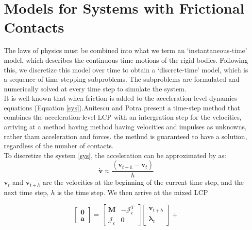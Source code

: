 \section{Models for Systems with Frictional Contacts}

        The laws of physics must be combined into what we term an `instantaneous-time' model, which describes the continuous-time motions of the rigid bodies. Following this, we discretize this model over time to obtain a ‘discrete-time’ model, which is a sequence of time-stepping subproblems. The subproblems are formulated and numerically solved at every time step to simulate the system. \\

        It is well known that when friction is added to the acceleration-level dynamics equations (Equation \ref{sys}).Anitescu and Potra \cite{anitescu1997modeling} present a time-step method that combines the acceleration-level LCP with an intergration step for the velocities, arriving at a method having method having velocities and impulses as unknowns, rather tham acceleration and forces. the methud is guaranteed to have a solution, regardless of the number of contacts. \\

        To discretize the system \ref{sys}, the acceleration can be approximated by \cite{anitescu1997modeling} as:
            \begin{equation}
                \dot{\mathbf{v}} \approx \frac{(\mathbf{v}_{t+h} - \mathbf{v}_t)}{h}
            \end{equation}
        $\mathbf{v}_t$ and $\mathbf{v}_{t+h}$ are the velocities at the beginning of the current time step, and the next time step, $h$ is the time step. We then arrive at the mixed LCP

        \begin{equation}
            \left[\begin{array}{c}\pmb{0} \\ \pmb{a} \end{array}\right] = \left[\begin{array}{cc} \pmb{M} & -\mathcal{J}_{c}^{T} \\ \mathcal{J}_{c} & 0 \end{array}\right] \left[\begin{array}{c} \mathbf{v}_{t+h} \\ \pmb{\lambda}_{c} \end{array}\right] + 
            \label{lcp}
        \end{equation}

